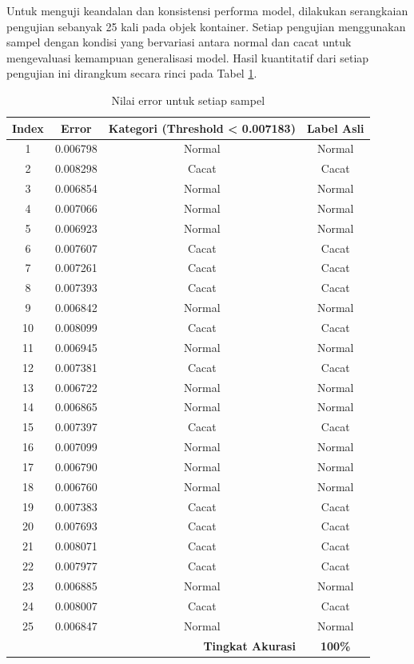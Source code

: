 Untuk menguji keandalan dan konsistensi performa model, dilakukan
serangkaian pengujian sebanyak 25 kali pada objek kontainer. Setiap
pengujian menggunakan sampel dengan kondisi yang bervariasi antara
normal dan cacat untuk mengevaluasi kemampuan generalisasi model.
Hasil kuantitatif dari setiap pengujian ini dirangkum secara rinci
pada Tabel \ref{tab:error-samples-web}.

\begin{table}[H]
  \centering
  \caption{Nilai error untuk setiap sampel}
  \label{tab:error-samples-web}
  \begin{tabular}{cccc}
    \toprule
    \textbf{Index} & \textbf{Error} & \textbf{Kategori (Threshold <
    0.007183)} & \textbf{Label Asli} \\
    \midrule
    1  & 0.006798 & Normal & Normal \\
    2  & 0.008298 & Cacat & Cacat \\
    3  & 0.006854 & Normal & Normal \\
    4  & 0.007066 & Normal & Normal \\
    5  & 0.006923 & Normal & Normal \\
    6  & 0.007607 & Cacat & Cacat \\
    7  & 0.007261 & Cacat & Cacat \\
    8  & 0.007393 & Cacat & Cacat \\
    9  & 0.006842 & Normal & Normal \\
    10 & 0.008099 & Cacat & Cacat \\
    11 & 0.006945 & Normal & Normal \\
    12 & 0.007381 & Cacat & Cacat \\
    13 & 0.006722 & Normal & Normal \\
    14 & 0.006865 & Normal & Normal \\
    15 & 0.007397 & Cacat & Cacat \\
    16 & 0.007099 & Normal & Normal \\
    17 & 0.006790 & Normal & Normal \\
    18 & 0.006760 & Normal & Normal \\
    19 & 0.007383 & Cacat & Cacat \\
    20 & 0.007693 & Cacat & Cacat \\
    21 & 0.008071 & Cacat & Cacat \\
    22 & 0.007977 & Cacat & Cacat \\
    23 & 0.006885 & Normal & Normal \\
    24 & 0.008007 & Cacat & Cacat \\
    25 & 0.006847 & Normal & Normal \\
    \midrule
    \multicolumn{3}{r}{\textbf{Tingkat Akurasi}} & \textbf{100\%} \\
    \bottomrule
  \end{tabular}
\end{table}

